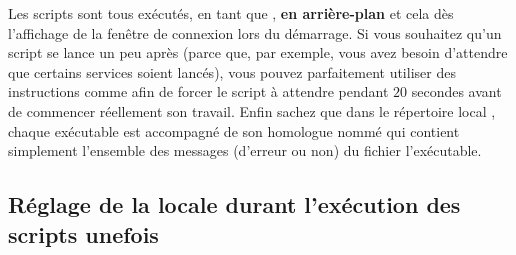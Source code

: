Les scripts  sont
tous exécutés, en tant que , \textbf{en arrière-plan}
et cela dès l'affichage de la fenêtre de connexion
lors du démarrage.
Si vous souhaitez qu'un script  se lance un peu après 
(parce que, par
exemple, vous avez besoin d'attendre que certains services soient
lancés), vous pouvez parfaitement utiliser des instructions comme
\og {} \fg{} afin de forcer le script à attendre
pendant $20$ secondes avant de
commencer réellement son travail. 
Enfin sachez que dans le répertoire
local , chaque exécutable 
est accompagné de son homologue nommé  qui contient
simplement l'ensemble des messages (d'erreur ou non) du fichier l'exécutable.




\subsection{Réglage de la locale durant l'exécution des scripts \og unefois \fg}

